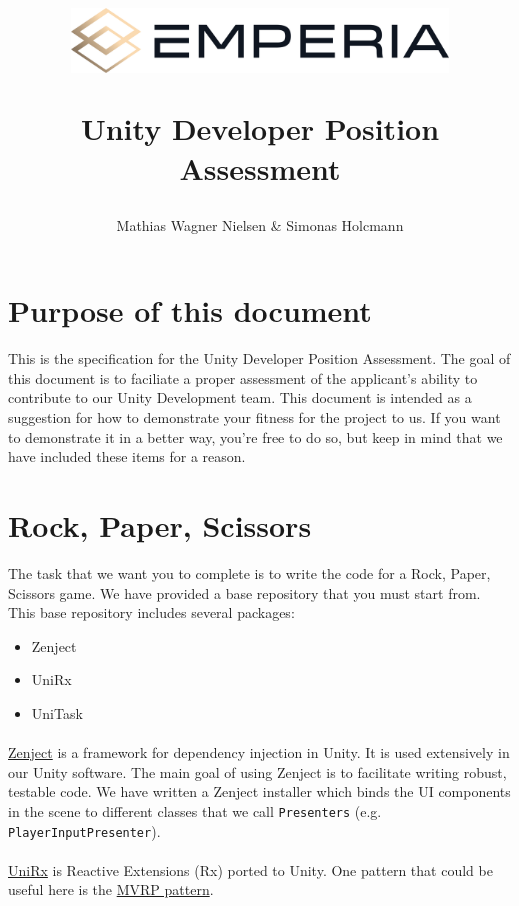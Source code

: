 \documentclass[12pt]{article}
\title{
{\includegraphics[width=10cm]{logo.png}}

{Unity Developer Position Assessment}
}
\author{Mathias Wagner Nielsen & Simonas Holcmann}
\begin{document}
\maketitle

\section{Purpose of this document}
This is the specification for the Unity Developer Position Assessment.
The goal of this document is to faciliate a proper assessment of the applicant's ability to contribute to our Unity Development team.
This document is intended as a suggestion for how to demonstrate your fitness for the project to us.
If you want to demonstrate it in a better way, you're free to do so, but keep in mind that we have included these items for a reason.

\section{Rock, Paper, Scissors}
The task that we want you to complete is to write the code for a Rock, Paper, Scissors game.
We have provided a base repository that you must start from.
This base repository includes several packages:
\begin{itemize}
    \itemsep-0.5em
    \item Zenject
    \item UniRx
    \item UniTask
\end{itemize}

\paragraph*{}
\href{https://github.com/modesttree/Zenject}{Zenject} is a framework for dependency injection in Unity.
It is used extensively in our Unity software.
The main goal of using Zenject is to facilitate writing robust, testable code.
We have written a Zenject installer which binds the UI components in the scene to different classes that we call \verb|Presenters| (e.g. \verb|PlayerInputPresenter|).

\paragraph*{}
\href{https://github.com/neuecc/UniRx}{UniRx} is Reactive Extensions (Rx) ported to Unity.
One pattern that could be useful here is the \href{https://github.com/neuecc/UniRx#model-view-reactivepresenter-pattern}{MVRP pattern}.
\end{document}
